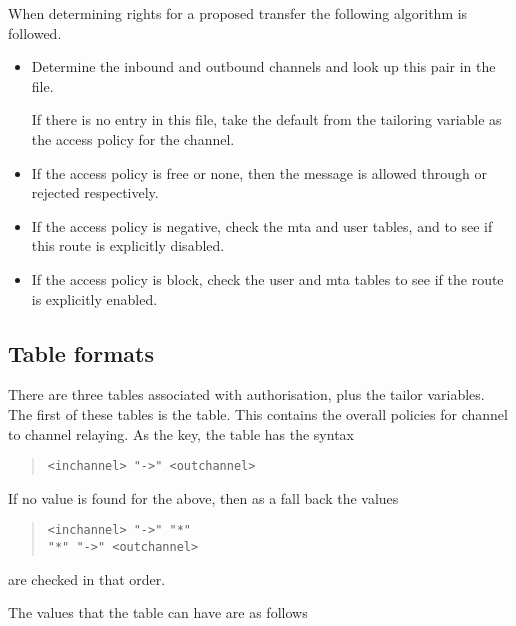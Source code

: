 When determining rights for a proposed transfer  the following
algorithm is followed.
\begin{itemize}
\item	Determine the inbound and outbound channels and look up
this pair in the  file.

If there is no entry in this file, take the default from the tailoring
variable as the access policy for the channel.

\item	If the access policy is free or none, then the message is
allowed through or rejected respectively.

\item	If the access policy is negative, check the mta and user
tables,  and  to see if this route is
explicitly disabled.

\item	If the access policy is block, check the user and mta tables
to see if the route is explicitly enabled.
\end{itemize}

\subsection{Table formats}
There are three tables associated with authorisation, plus the tailor
variables. The first of these tables is the  table.
This contains the overall policies for channel to channel relaying.
As the key, the table has the syntax 

\begin{quote}\small\begin{verbatim}
<inchannel> "->" <outchannel>
\end{verbatim}\end{quote}

If no value is found for the above, then as a fall back the values
\begin{quote}\small\begin{verbatim}
<inchannel> "->" "*"
"*" "->" <outchannel>
\end{verbatim}\end{quote}
are checked in that order.

The values that the table can have are as follows

